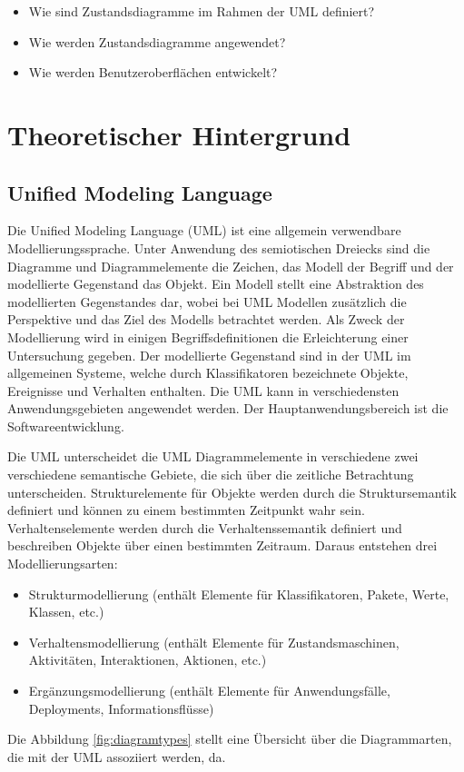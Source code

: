 \documentclass[first=Christoph,last=Hoentzsch,company=Softwareprojekt,location=Dresden,simple, noheader]{baarticle}
\begin{document}
\begin{basimple}
        \begin{itemize}
            \item Wie sind Zustandsdiagramme im Rahmen der \gls{UML} definiert?
            \item Wie werden Zustandsdiagramme angewendet?
            \item Wie werden Benutzeroberflächen entwickelt?
        \end{itemize}

        \newpage
    \section{Theoretischer Hintergrund} \label{sec:theory}
        \subsection{Unified Modeling Language}
        Die Unified Modeling Language (\gls{UML}) ist eine allgemein verwendbare Modellierungssprache.
        Unter Anwendung des semiotischen Dreiecks sind die Diagramme und Diagrammelemente die Zeichen, das Modell der Begriff und der modellierte Gegenstand das Objekt.
        Ein Modell stellt eine Abstraktion des modellierten Gegenstandes dar, wobei bei \gls{UML} Modellen zusätzlich die Perspektive und das Ziel des Modells betrachtet werden.
        Als Zweck der Modellierung wird in einigen Begriffsdefinitionen die Erleichterung einer Untersuchung gegeben.
        Der modellierte Gegenstand sind in der \gls{UML} im allgemeinen Systeme, welche durch Klassifikatoren bezeichnete Objekte, Ereignisse und Verhalten enthalten.
        Die \gls{UML} kann in verschiedensten Anwendungsgebieten angewendet werden.
        Der Hauptanwendungsbereich ist die Softwareentwicklung.

        Die \gls{UML} unterscheidet die \gls{UML} Diagrammelemente in verschiedene zwei verschiedene semantische Gebiete, die sich über die zeitliche Betrachtung unterscheiden.
        Strukturelemente für Objekte werden durch die Struktursemantik definiert und können zu einem bestimmten Zeitpunkt wahr sein.
        Verhaltenselemente werden durch die Verhaltenssemantik definiert und beschreiben Objekte über einen bestimmten Zeitraum.
        Daraus entstehen drei Modellierungsarten:
        \begin{itemize}
            \item Strukturmodellierung (enthält Elemente für Klassifikatoren, Pakete, Werte, Klassen, etc.)
            \item Verhaltensmodellierung (enthält Elemente für Zustandsmaschinen, Aktivitäten, Interaktionen, Aktionen, etc.)
            \item Ergänzungsmodellierung (enthält Elemente für Anwendungsfälle, Deployments, Informationsflüsse)
        \end{itemize}
        Die Abbildung \ref{fig:diagramtypes} stellt eine Übersicht über die Diagrammarten, die mit der \gls{UML} assoziiert werden, da.


\end{basimple}
\end{document}
